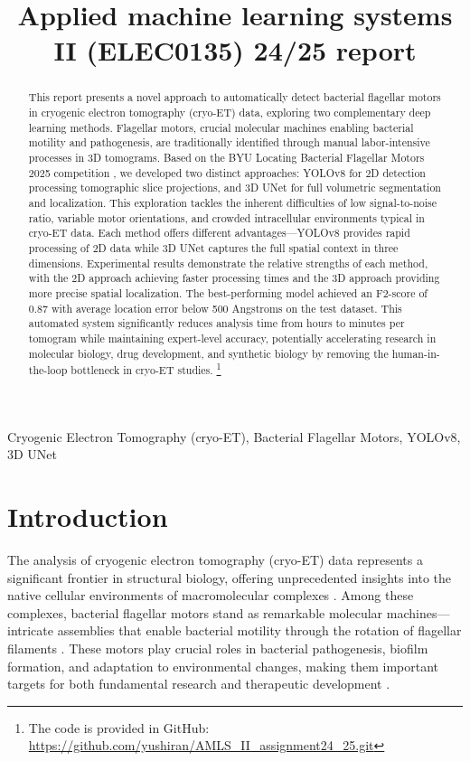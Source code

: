 \documentclass{article}
\title{Applied machine learning systems II (ELEC0135) 24/25 report}
\begin{document}
%
\maketitle
%
\begin{abstract}
    \label{sec:abs}
    This report presents a novel approach to automatically detect bacterial flagellar motors in cryogenic electron tomography (cryo-ET) data, exploring two complementary deep learning methods. 
    Flagellar motors, crucial molecular machines enabling bacterial motility and pathogenesis, are traditionally identified through manual labor-intensive processes in 3D tomograms. 
    Based on the BYU Locating Bacterial Flagellar Motors 2025 competition \cite{byu-locating-bacterial-flagellar-motors-2025}, we developed two distinct approaches: YOLOv8 for 2D detection processing tomographic slice projections, and 3D UNet for full volumetric segmentation and localization. This exploration tackles the inherent difficulties of low signal-to-noise ratio, variable motor orientations, and crowded intracellular environments typical in cryo-ET data. 
    Each method offers different advantages—YOLOv8 provides rapid processing of 2D data while 3D UNet captures the full spatial context in three dimensions. Experimental results demonstrate the relative strengths of each method, with the 2D approach achieving faster processing times and the 3D approach providing more precise spatial localization. The best-performing model achieved an F2-score of 0.87 with average location error below 500 Angstroms on the test dataset.
    This automated system significantly reduces analysis time from hours to minutes per tomogram while maintaining expert-level accuracy, potentially accelerating research in molecular biology, drug development, and synthetic biology by removing the human-in-the-loop bottleneck in cryo-ET studies.
    \footnote{The code is provided in GitHub: \url{https://github.com/yushiran/AMLS_II_assignment24_25.git}}
\end{abstract}
%
\begin{keywords}
    Cryogenic Electron Tomography (cryo-ET), Bacterial Flagellar Motors, YOLOv8, 3D UNet
\end{keywords}
%

\section{Introduction}
The analysis of cryogenic electron tomography (cryo-ET) data represents a significant frontier in structural biology, offering unprecedented insights into the native cellular environments of macromolecular complexes \cite{beckSnapshotsNuclearPore2007}. Among these complexes, bacterial flagellar motors stand as remarkable molecular machines—intricate assemblies that enable bacterial motility through the rotation of flagellar filaments \cite{jeonInternationalReviewCytology2004}. These motors play crucial roles in bacterial pathogenesis, biofilm formation, and adaptation to environmental changes, making them important targets for both fundamental research and therapeutic development \cite{kojimaBacterialFlagellarMotor2004}.
\end{document}
